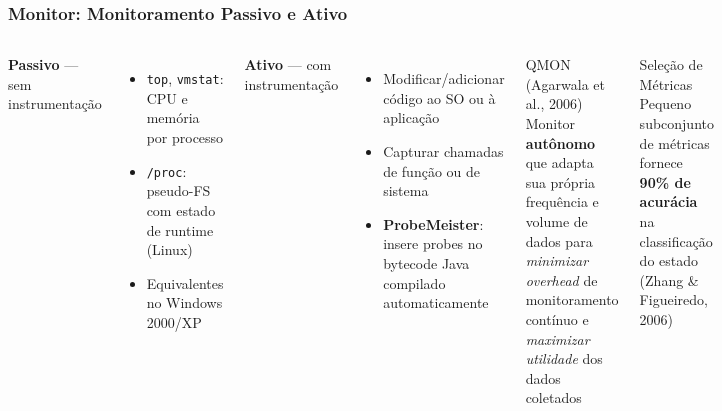 \documentclass{beamer}
\begin{document}
  \begin{frame}
    \frametitle{Monitor: Monitoramento Passivo e Ativo}
    \begin{columns}
      \textbf{Passivo} --- sem instrumentação
      \begin{itemize}
        \footnotesize
        \item \texttt{top}, \texttt{vmstat}: CPU e memória por processo
        \item \texttt{/proc}: pseudo-FS com estado de runtime (Linux)
        \item Equivalentes no Windows 2000/XP
      \end{itemize}
      \vspace{0.2cm}
      \textbf{Ativo} --- com instrumentação
      \begin{itemize}
        \footnotesize
        \item Modificar/adicionar código ao SO ou à aplicação
        \item Capturar chamadas de função ou de sistema
        \item \textbf{ProbeMeister}: insere probes no bytecode Java compilado automaticamente
      \end{itemize}
      \begin{block}{QMON (Agarwala et al., 2006)}
        \footnotesize
        Monitor \textbf{autônomo} que adapta sua própria frequência e volume de dados para \textit{minimizar overhead} de monitoramento contínuo e \textit{maximizar utilidade} dos dados coletados
      \end{block}
      \begin{alertblock}{\footnotesize Seleção de Métricas}
        \footnotesize
        Pequeno subconjunto de métricas fornece \textbf{90\% de acurácia} na classificação do estado (Zhang \& Figueiredo, 2006)
      \end{alertblock}
    \end{columns}
  \end{frame}
\end{document}
